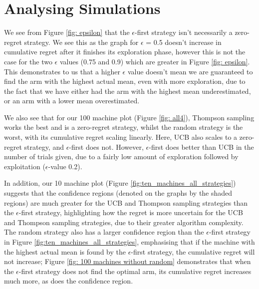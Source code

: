 \section{Analysing Simulations}\label{sec:analysing-simulations}
We see from Figure \ref{fig: epsilon} that the $\epsilon$-first strategy isn't necessarily a zero-regret strategy.
We see this as the graph for $\epsilon$ = 0.5 doesn't increase in cumulative regret after it finishes its exploration phase, however this is not the case for the two $\epsilon$ values (0.75 and 0.9) which are greater in Figure \ref{fig: epsilon}.
This demonstrates to us that a higher $\epsilon$ value doesn't mean we are guaranteed to find the arm with the highest actual mean, even with more exploration, due to the fact that we have either had the arm with the highest mean underestimated, or an arm with a lower mean overestimated.

We also see that for our 100 machine plot (Figure \ref{fig: all4}), Thompson sampling works the best and is a zero-regret strategy, whilst the random strategy is the worst, with its cumulative regret scaling linearly.
Here, UCB also scales to a zero-regret strategy, and $\epsilon$-first does not.
However, $\epsilon$-first does better than UCB in the number of trials given, due to a fairly low amount of exploration followed by exploitation ($\epsilon$-value 0.2).

In addition, our 10 machine plot (Figure \ref{fig:ten_machines_all_strategies})   suggests that the confidence regions (denoted on the graphs by the shaded regions) are much greater for the UCB and Thompson sampling strategies than the $\epsilon$-first strategy, highlighting how the regret is more uncertain for the UCB and Thompson sampling strategies, due to their greater algorithm complexity.
The random strategy also has a larger confidence region than the $\epsilon$-first strategy in Figure \ref{fig:ten_machines_all_strategies}, emphasising that if the machine with the highest actual mean is found by the $\epsilon$-first strategy, the cumulative regret will not increase;
Figure \ref{fig: 100 machines without random} demonstrates that when the $\epsilon$-first strategy does not find the optimal arm, its cumulative regret increases much more, as does the confidence region.